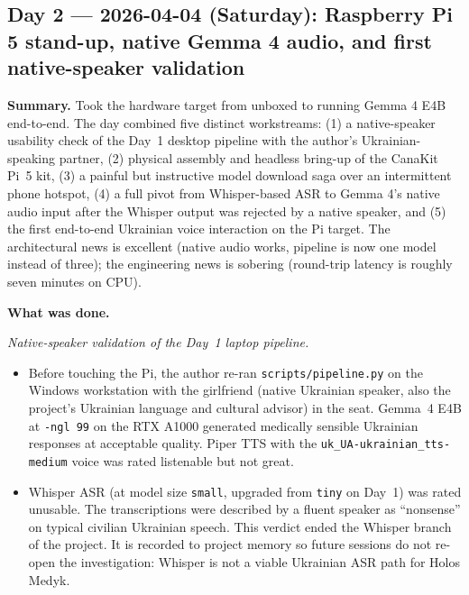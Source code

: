 \documentclass{article}
\theoremstyle{plain}
\theoremstyle{definition}
\theoremstyle{remark}
\begin{document}
\subsection*{Day 2 --- 2026-04-04 (Saturday): Raspberry Pi 5 stand-up, native Gemma 4 audio, and first native-speaker validation}

\textbf{Summary.} Took the hardware target from unboxed to running Gemma 4 E4B end-to-end. The day combined five distinct workstreams: (1) a native-speaker usability check of the Day~1 desktop pipeline with the author's Ukrainian-speaking partner, (2) physical assembly and headless bring-up of the CanaKit Pi~5 kit, (3) a painful but instructive model download saga over an intermittent phone hotspot, (4) a full pivot from Whisper-based ASR to Gemma 4's native audio input after the Whisper output was rejected by a native speaker, and (5) the first end-to-end Ukrainian voice interaction on the Pi target. The architectural news is excellent (native audio works, pipeline is now one model instead of three); the engineering news is sobering (round-trip latency is roughly seven minutes on CPU).

\textbf{What was done.}

\textit{Native-speaker validation of the Day~1 laptop pipeline.}
\begin{itemize}
\item Before touching the Pi, the author re-ran \texttt{scripts/pipeline.py} on the Windows workstation with the girlfriend (native Ukrainian speaker, also the project's Ukrainian language and cultural advisor) in the seat. Gemma~4 E4B at \texttt{-ngl~99} on the RTX A1000 generated medically sensible Ukrainian responses at acceptable quality. Piper TTS with the \texttt{uk\_UA-ukrainian\_tts-medium} voice was rated listenable but not great.
\item Whisper ASR (at model size \texttt{small}, upgraded from \texttt{tiny} on Day~1) was rated unusable. The transcriptions were described by a fluent speaker as ``nonsense'' on typical civilian Ukrainian speech. This verdict ended the Whisper branch of the project. It is recorded to project memory so future sessions do not re-open the investigation: Whisper is not a viable Ukrainian ASR path for Holos Medyk.
\end{itemize}
\end{document}
